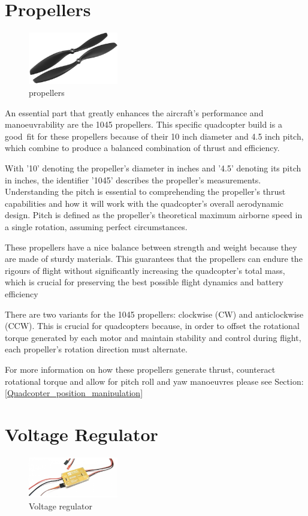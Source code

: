 \documentclass{report}
\begin{document}
\section{Propellers}
\begin{figure}[H]
  \centering
  \includegraphics[width=0.35\textwidth]{Pictures/props.png}
  \caption{propellers}
  \label{fig:propellers}
\end{figure}
An essential part that greatly enhances the aircraft's performance and
manoeuvrability are the 1045 propellers. This specific quadcopter build is a
good fit for these propellers because of their 10 inch diameter and 4.5 inch
pitch, which combine to produce a balanced combination of thrust and efficiency. 

With '10' denoting the propeller's diameter in inches and '4.5' denoting its
pitch in inches, the identifier '1045' describes the propeller's measurements.
Understanding the pitch is essential to comprehending the propeller's thrust
capabilities and how it will work with the quadcopter's overall aerodynamic
design. Pitch is defined as the propeller's theoretical maximum airborne speed
in a single rotation, assuming perfect circumstances.

These propellers have a nice balance between strength and weight because they
are made of sturdy materials. This guarantees that the propellers can endure the
rigours of flight without significantly increasing the quadcopter's total mass,
which is crucial for preserving the best possible flight dynamics and
battery efficiency 

There are two variants for the 1045 propellers: clockwise (CW) and anticlockwise
(CCW). This is crucial for quadcopters because, in order to offset the
rotational torque generated by each motor and maintain stability and control
during flight, each propeller's rotation direction must alternate.

For more information on how these propellers generate thrust, counteract
rotational torque and allow for pitch roll and yaw manoeuvres please see
Section:\ref{Quadcopter_position_manipulation}
\section{Voltage Regulator}
\begin{figure}[H]
  \centering
  \includegraphics[width=0.35\textwidth]{Pictures/voltage_regulator.png}
  \caption{Voltage regulator}
  \label{fig:voltage_regulator}
\end{figure}
\end{document}
